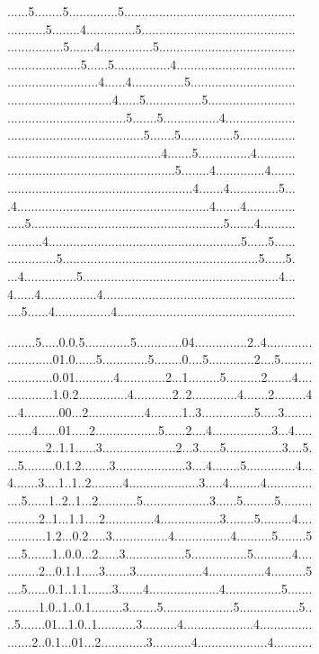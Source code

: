 \documentclass{article}
\begin{document}
\begin{figure}[h]
\begin{minipage}[t]{.5\textwidth}
\raggedright
......5........5..............5.................................................
...........5........4..............5............................................
................5.......4...............5.......................................
.....................5......5................4..................................
..........................4......4...............5..............................
..............................4......5................5.........................
..................................5.......5................4....................
.......................................5.......5...............5................
............................................4.......5...............4...........
................................................5........4..............4.......
.....................................................4.......4..............5...
.4.......................................................4.......4..............
.....5.......................................................5.......4..........
..........4.......................................................5......5......
..............5........................................................5......5.
...4...............5........................................................4...
4......4................4.......................................................
....5......4................4...................................................
\end{minipage}%
\begin{minipage}[t]{.5\textwidth}
\raggedleft
........5.....0.0.5.............5.............04...............2..4.............
.............01.0......5.............5........0....5.............2....5.........
.............0.01...........4.............2...1.........5..........2.......4....
.............1.0.2..............4...........2..2.............4.......2.........4
...4..........00...2................4.........1..3...............5.....3........
.......4......01.....2..................5......2....4.................3...4.....
...........2..1.1......3.....................2...3......5................3....5.
...5.........0.1.2........3....................3....4........5..............4...
4.......3....1..1..2.........4....................3.....4.........4.............
....5......1..2..1...2...........5...................3......5.........5.........
.........2..1...1.1....2..............4.................3........5.........4....
...........1.2...0.2.....3................4................4..........5........5
....5.......1..0.0...2......3.................5................5...........4....
.........2...0.1.1.....3.......3...................4................4..........5
....5......0.1..1.1.......3.......4....................4................5.......
.........1.0..1..0.1.........3........5....................5.................5..
..5.......01...1.0..1...........3..........4....................4...............
.......2..0.1...01...2.............3...........4....................4...........


\end{minipage}
\end{figure}
\end{document}
